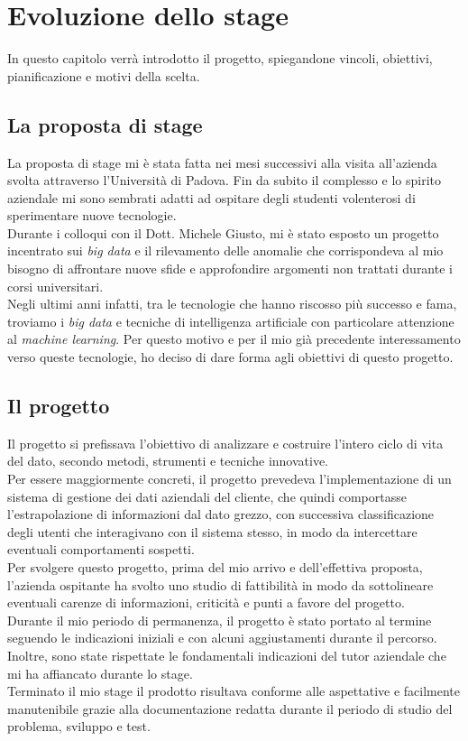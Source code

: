 
\chapter{Evoluzione dello stage}\label{ch:evoluzione-dello-stage}
In questo capitolo verrà introdotto il progetto, spiegandone vincoli, obiettivi, pianificazione e motivi della scelta.
\section{La proposta di stage}
La proposta di stage mi è stata fatta nei mesi successivi alla visita all'azienda svolta attraverso l'Università di Padova. Fin da subito il complesso e lo spirito aziendale mi sono sembrati adatti ad ospitare degli studenti volenterosi di sperimentare nuove tecnologie.
\\
Durante i colloqui con il Dott. Michele Giusto, mi è stato esposto un progetto incentrato sui \emph{big data} e il rilevamento delle anomalie che corrispondeva al mio bisogno di affrontare nuove sfide e approfondire argomenti non trattati durante i corsi universitari.
\\
Negli ultimi anni infatti, tra le tecnologie che hanno riscosso più successo e fama, troviamo i \emph{big data} e tecniche di intelligenza artificiale con particolare attenzione al \emph{machine learning}.
Per questo motivo e per il mio già precedente interessamento verso queste tecnologie, ho deciso di dare forma agli obiettivi di questo progetto. 

\section{Il progetto}
Il progetto si prefissava l'obiettivo di analizzare e costruire l'intero ciclo di vita del dato, secondo metodi, strumenti e tecniche innovative.
\\
Per essere maggiormente concreti, il progetto prevedeva l'implementazione di un sistema di gestione dei dati aziendali del cliente, che quindi comportasse l'estrapolazione di informazioni dal dato grezzo, con successiva classificazione degli utenti che interagivano con il sistema stesso, in modo da intercettare eventuali comportamenti sospetti.
\\
Per svolgere questo progetto, prima del mio arrivo e dell'effettiva proposta, l'azienda ospitante ha svolto uno studio di fattibilità in modo da sottolineare eventuali carenze di informazioni, criticità e punti a favore del progetto.
\\
Durante il mio periodo di permanenza, il progetto è stato portato al termine seguendo le indicazioni iniziali e con alcuni aggiustamenti durante il percorso. Inoltre, sono state rispettate le fondamentali indicazioni del tutor aziendale che mi ha affiancato durante lo stage.
\\
Terminato il mio stage il prodotto risultava conforme alle aspettative e facilmente manutenibile grazie alla documentazione redatta durante il periodo di studio del problema, sviluppo e test.
